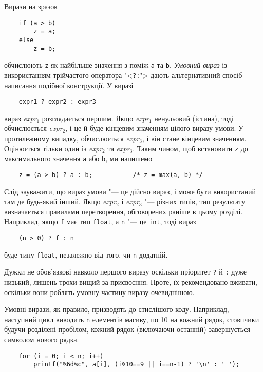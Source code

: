 \documentclass[a4paper,12pt]{book}
\begin{document}
  Вирази на зразок
  \begin{verbatim}
    if (a > b)
        z = a;
    else
        z = b;
  \end{verbatim}
  обчислюють \texttt{z} як найбільше значення з-поміж \texttt{a} та \texttt{b}. \textit{Умовний
  вираз} із використанням трійчастого оператора "<\texttt{?:}"> дають
  альтернативний спосіб написання подібної конструкції. У виразі
  \begin{verbatim}
    expr1 ? expr2 : expr3
  \end{verbatim}
  вираз \textit{expr\(_{1}\)} розглядається першим. Якщо \textit{expr\(_{1}\)}
  ненульовий (істина), тоді обчислюється \textit{expr\(_{2}\)}, і це й буде кінцевим
  значенням цілого виразу умови. У протилежному випадку, обчислюється
  \textit{expr\(_{3}\)}, і він стане кінцевим значенням. Оцінюється тільки один із
  \textit{expr\(_{2}\)} та \textit{expr\(_{3}\)}. Таким чином, щоб встановити
  \texttt{z} до максимального значення \texttt{a} або \texttt{b}, ми напишемо
  \begin{verbatim}
    z = (a > b) ? a : b;           /* z = max(a, b) */
  \end{verbatim}

  Слід зауважити, що вираз умови "--- це дійсно вираз, і може бути використаний там де
  будь-який інший. Якщо \textit{expr\(_{2}\)} і \textit{expr\(_{3}\)} "--- різних
  типів, тип результату визначається правилами перетворення, обговорених раніше в цьому
  розділі. Наприклад, якщо \texttt{f} має тип \texttt{float}, а \texttt{n} "--- це
  \texttt{int}, тоді вираз
  \begin{verbatim}
    (n > 0) ? f : n
  \end{verbatim}
  буде типу \texttt{float}, незалежно від того, чи \texttt{n} додатній.

  Дужки не обов'язкові навколо першого виразу оскільки пріоритет \texttt{?} й \texttt{:}
  дуже низький, лишень трохи вищий за присвоєння. Проте, їх рекомендовано вживати,
  оскільки вони роблять умовну частину виразу очевиднішою.

  Умовні вирази, як правило, призводять до стислішого коду. Наприклад, наступний цикл
  виводить \texttt{n} елементів масиву, по 10 на кожний рядок, стовпчики будучи розділені
  пробілом, кожний рядок (включаючи останній) завершується символом нового рядка.
  \begin{verbatim}
    for (i = 0; i < n; i++)
        printf("%6d%c", a[i], (i%10==9 || i==n-1) ? '\n' : ' ');
  \end{verbatim}
\end{document}

